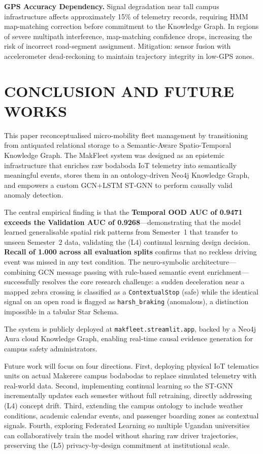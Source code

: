 \documentclass{ieeeaccess}
\begin{document}
\textbf{GPS Accuracy Dependency.}
Signal degradation near tall campus infrastructure affects
approximately 15\% of telemetry records, requiring HMM map-matching
correction before commitment to the Knowledge Graph. In regions of
severe multipath interference, map-matching confidence drops,
increasing the risk of incorrect road-segment assignment.
Mitigation: sensor fusion with accelerometer dead-reckoning to
maintain trajectory integrity in low-GPS zones.

\section{CONCLUSION AND FUTURE WORKS}
\label{sec:conclusion}

This paper reconceptualised micro-mobility fleet management by
transitioning from antiquated relational storage to a Semantic-Aware
Spatio-Temporal Knowledge Graph. The MakFleet system was designed as
an epistemic infrastructure that enriches raw bodaboda IoT telemetry
into semantically meaningful events, stores them in an
ontology-driven Neo4j Knowledge Graph, and empowers a custom
GCN+LSTM ST-GNN to perform causally valid anomaly detection.

The central empirical finding is that the \textbf{Temporal OOD AUC of
0.9471 exceeds the Validation AUC of 0.9268}---demonstrating that the
model learned generalisable spatial risk patterns from Semester~1 that
transfer to unseen Semester~2 data, validating the (L4) continual
learning design decision. \textbf{Recall of 1.000 across all
evaluation splits} confirms that no reckless driving event was missed
in any test condition. The neuro-symbolic architecture---combining
GCN message passing with rule-based semantic event
enrichment---successfully resolves the core research challenge: a
sudden deceleration near a mapped zebra crossing is classified as a
\texttt{ContextualStop} (safe) while the identical signal on an open
road is flagged as \texttt{harsh\_braking} (anomalous), a distinction
impossible in a tabular Star Schema.

The system is publicly deployed at
\texttt{makfleet.streamlit.app}, backed by a Neo4j Aura cloud
Knowledge Graph, enabling real-time causal evidence generation for
campus safety administrators.

Future work will focus on four directions. First, deploying physical
IoT telematics units on actual Makerere campus bodabodas to replace
simulated telemetry with real-world data. Second, implementing
continual learning so the ST-GNN incrementally updates each semester
without full retraining, directly addressing (L4) concept drift.
Third, extending the campus ontology to include weather conditions,
academic calendar events, and passenger boarding zones as contextual
signals. Fourth, exploring Federated Learning so multiple Ugandan
universities can collaboratively train the model without sharing raw
driver trajectories, preserving the (L5) privacy-by-design
commitment at institutional scale.
\end{document}
